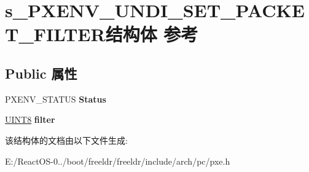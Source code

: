 \hypertarget{structs___p_x_e_n_v___u_n_d_i___s_e_t___p_a_c_k_e_t___f_i_l_t_e_r}{}\section{s\+\_\+\+P\+X\+E\+N\+V\+\_\+\+U\+N\+D\+I\+\_\+\+S\+E\+T\+\_\+\+P\+A\+C\+K\+E\+T\+\_\+\+F\+I\+L\+T\+E\+R结构体 参考}
\label{structs___p_x_e_n_v___u_n_d_i___s_e_t___p_a_c_k_e_t___f_i_l_t_e_r}
\subsection*{Public 属性}
\begin{DoxyCompactItemize}
\item 
\mbox{\label{structs___p_x_e_n_v___u_n_d_i___s_e_t___p_a_c_k_e_t___f_i_l_t_e_r_a9d35819d16b2e5b44685bb70b57f4c72}} 
P\+X\+E\+N\+V\+\_\+\+S\+T\+A\+T\+US {\bfseries Status}
\item 
\mbox{\label{structs___p_x_e_n_v___u_n_d_i___s_e_t___p_a_c_k_e_t___f_i_l_t_e_r_ac264d1a79e5650c303b923958c9dbb88}} 
\hyperlink{_processor_bind_8h_ab27e9918b538ce9d8ca692479b375b6a}{U\+I\+N\+T8} {\bfseries filter}
\end{DoxyCompactItemize}


该结构体的文档由以下文件生成\+:\begin{DoxyCompactItemize}
\item 
E\+:/\+React\+O\+S-\/0../boot/freeldr/freeldr/include/arch/pc/pxe.\+h\end{DoxyCompactItemize}
